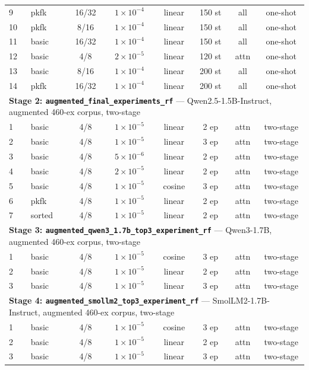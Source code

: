 {\begin{longtable}{llcccccc}
9  & pkfk   & 16/32 & $1\!\times\!10^{-4}$ & linear & 150 st & all  & one-shot \\
10 & pkfk   & 8/16  & $1\!\times\!10^{-4}$ & linear & 150 st & all  & one-shot \\
11 & basic  & 16/32 & $1\!\times\!10^{-4}$ & linear & 150 st & all  & one-shot \\
12 & basic  & 4/8   & $2\!\times\!10^{-5}$ & linear & 120 st & attn & one-shot \\
13 & basic  & 8/16  & $1\!\times\!10^{-4}$ & linear & 200 st & all  & one-shot \\
14 & pkfk   & 16/32 & $1\!\times\!10^{-4}$ & linear & 200 st & all  & one-shot \\
\midrule
\multicolumn{8}{l}{\textbf{Stage 2: \texttt{augmented\_final\_experiments\_rf}} --- Qwen2.5-1.5B-Instruct, augmented 460-ex corpus, two-stage}\\
\midrule
1 & basic  & 4/8 & $1\!\times\!10^{-5}$ & linear & 2 ep & attn & two-stage \\
2 & basic  & 4/8 & $1\!\times\!10^{-5}$ & linear & 3 ep & attn & two-stage \\
3 & basic  & 4/8 & $5\!\times\!10^{-6}$ & linear & 2 ep & attn & two-stage \\
4 & basic  & 4/8 & $2\!\times\!10^{-5}$ & linear & 2 ep & attn & two-stage \\
5 & basic  & 4/8 & $1\!\times\!10^{-5}$ & cosine & 3 ep & attn & two-stage \\
6 & pkfk   & 4/8 & $1\!\times\!10^{-5}$ & linear & 2 ep & attn & two-stage \\
7 & sorted & 4/8 & $1\!\times\!10^{-5}$ & linear & 2 ep & attn & two-stage \\
\midrule
\multicolumn{8}{l}{\textbf{Stage 3: \texttt{augmented\_qwen3\_1.7b\_top3\_experiment\_rf}} --- Qwen3-1.7B, augmented 460-ex corpus, two-stage}\\
\midrule
1 & basic & 4/8 & $1\!\times\!10^{-5}$ & cosine & 3 ep & attn & two-stage \\
2 & basic & 4/8 & $1\!\times\!10^{-5}$ & linear & 2 ep & attn & two-stage \\
3 & basic & 4/8 & $1\!\times\!10^{-5}$ & linear & 3 ep & attn & two-stage \\
\midrule
\multicolumn{8}{l}{\textbf{Stage 4: \texttt{augmented\_smollm2\_top3\_experiment\_rf}} --- SmolLM2-1.7B-Instruct, augmented 460-ex corpus, two-stage}\\
\midrule
1 & basic & 4/8 & $1\!\times\!10^{-5}$ & cosine & 3 ep & attn & two-stage \\
2 & basic & 4/8 & $1\!\times\!10^{-5}$ & linear & 2 ep & attn & two-stage \\
3 & basic & 4/8 & $1\!\times\!10^{-5}$ & linear & 3 ep & attn & two-stage \\
\end{longtable}
}
